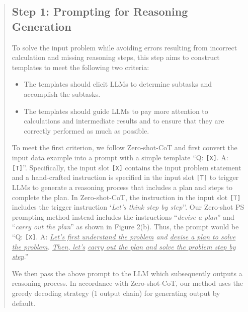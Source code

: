 \documentclass[11pt]{article}
\begin{document}
\begin{abstract}
\subsection{Step 1: Prompting for Reasoning Generation}
To solve the input problem while avoiding errors resulting from incorrect calculation and missing reasoning steps, this step aims to construct templates to meet the following two criteria:
\begin{itemize}
    \item The templates should elicit LLMs to determine subtasks and accomplish the subtasks.
    \item The templates should guide LLMs to pay more attention to calculations and intermediate results and to ensure that they are correctly performed as much as possible.
\end{itemize}

To meet the first criterion, we follow Zero-shot-CoT and first convert the input data example into a prompt with a simple template ``Q: \texttt{[X]}. A: \texttt{[T]}''. 
Specifically, the input slot \texttt{[X]} contains the input problem statement and a hand-crafted instruction is specified in the input slot \texttt{[T]} to trigger LLMs to generate a reasoning process that includes a plan and steps to complete the plan.  In Zero-shot-CoT, the instruction in the input slot \texttt{[T]} includes the trigger instruction `\textit{Let's think step by step}''.  Our Zero-shot PS prompting method instead includes the instructions ``\textit{devise a plan}'' and ``\textit{carry out the plan}'' as shown in Figure 2(b).  Thus, the prompt would be ``Q: \texttt{[X]}. A: \textit{\underline{Let’s first understand the problem} and \underline{devise a plan to solve the problem}. \underline{Then, let’s} \underline{carry out the plan and solve the problem step by} \underline{step}}.''

We then pass the above prompt to the LLM which subsequently outputs a reasoning process. In accordance with Zero-shot-CoT, our method uses the greedy decoding  strategy (1 output chain) for generating output by default. 


\end{abstract}
\end{document}
